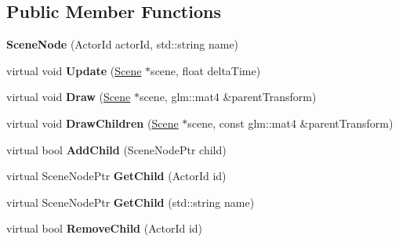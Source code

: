 \subsection*{Public Member Functions}
\begin{DoxyCompactItemize}
\item 
\mbox{\label{classTarbora_1_1SceneNode_a69d809d7aa57507a26083f55d7db3b40}} 
{\bfseries Scene\+Node} (Actor\+Id actor\+Id, std\+::string name)
\item 
\mbox{\label{classTarbora_1_1SceneNode_aa632d88ac3e509bed916c1ecf0264768}} 
virtual void {\bfseries Update} (\hyperlink{classTarbora_1_1Scene}{Scene} $\ast$scene, float delta\+Time)
\item 
\mbox{\label{classTarbora_1_1SceneNode_aff5dabdf9d6e3a022c44612f24ec9cd4}} 
virtual void {\bfseries Draw} (\hyperlink{classTarbora_1_1Scene}{Scene} $\ast$scene, glm\+::mat4 \&parent\+Transform)
\item 
\mbox{\label{classTarbora_1_1SceneNode_a83d18f622f63dbb91a676c3c69815942}} 
virtual void {\bfseries Draw\+Children} (\hyperlink{classTarbora_1_1Scene}{Scene} $\ast$scene, const glm\+::mat4 \&parent\+Transform)
\item 
\mbox{\label{classTarbora_1_1SceneNode_a67018d89636c37f1b5eeae83c03176e2}} 
virtual bool {\bfseries Add\+Child} (Scene\+Node\+Ptr child)
\item 
\mbox{\label{classTarbora_1_1SceneNode_ae26162bcafa1831787d9adca31bb3f87}} 
virtual Scene\+Node\+Ptr {\bfseries Get\+Child} (Actor\+Id id)
\item 
\mbox{\label{classTarbora_1_1SceneNode_a43833185ef55584ef8e9c5a82aac2f16}} 
virtual Scene\+Node\+Ptr {\bfseries Get\+Child} (std\+::string name)
\item 
\mbox{\label{classTarbora_1_1SceneNode_a096510db96d082b343120f3975933f90}} 
virtual bool {\bfseries Remove\+Child} (Actor\+Id id)
\item 
\mbox{\label{classTarbora_1_1SceneNode_ad5939b9062f6235530aeb71a4df43300}} 

\end{DoxyCompactItemize}
